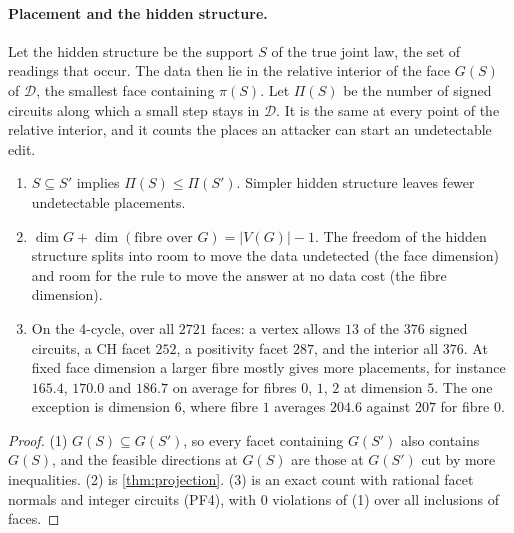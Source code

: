 \documentclass[11pt]{article}
\theoremstyle{definition}\newtheorem{definition}[theorem]{Definition}\newtheorem{remark}[theorem]{Remark}\newtheorem{example}[theorem]{Example}\newtheorem{problem}[theorem]{Open problem}\crefname{problem}{Problem}{Problems}
\begin{document}
\paragraph{Placement and the hidden structure.} Let the hidden structure be the support $S$ of the true joint law, the set of readings that occur. The data then lie in the relative interior of the face $G(S)$ of $\mathcal D$, the smallest face containing $\pi(S)$. Let $\Pi(S)$ be the number of signed circuits along which a small step stays in $\mathcal D$. It is the same at every point of the relative interior, and it counts the places an attacker can start an undetectable edit.

\begin{proposition}[placement]\label{prop:placement}
\begin{enumerate}
\item[(1)] $S\subseteq S'$ implies $\Pi(S)\le\Pi(S')$. Simpler hidden structure leaves fewer undetectable placements.
\item[(2)] $\dim G+\dim(\text{fibre over }G)=|V(G)|-1$. The freedom of the hidden structure splits into room to move the data undetected (the face dimension) and room for the rule to move the answer at no data cost (the fibre dimension).
\item[(3)] On the 4-cycle, over all $2721$ faces: a vertex allows $13$ of the $376$ signed circuits, a CH facet $252$, a positivity facet $287$, and the interior all $376$. At fixed face dimension a larger fibre mostly gives more placements, for instance $165.4$, $170.0$ and $186.7$ on average for fibres $0$, $1$, $2$ at dimension $5$. The one exception is dimension $6$, where fibre $1$ averages $204.6$ against $207$ for fibre $0$.
\end{enumerate}
\end{proposition}

\begin{proof}
(1) $G(S)\subseteq G(S')$, so every facet containing $G(S')$ also contains $G(S)$, and the feasible directions at $G(S)$ are those at $G(S')$ cut by more inequalities. (2) is \cref{thm:projection}. (3) is an exact count with rational facet normals and integer circuits (PF4), with $0$ violations of (1) over all inclusions of faces.
\end{proof}
\end{document}
